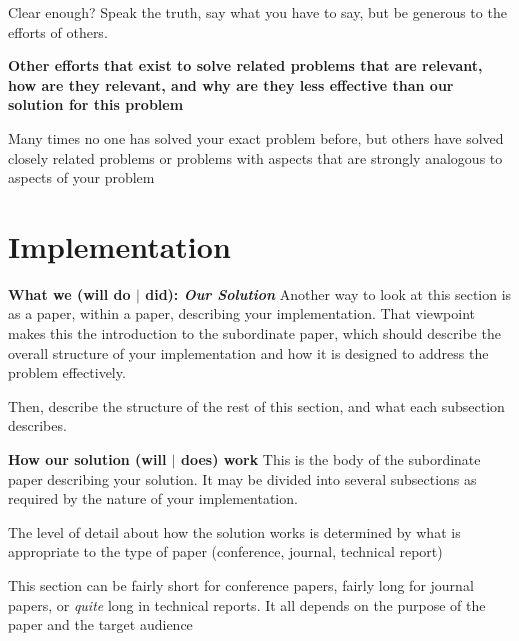 \documentclass[pdf,bookmarks,colorlinks=true]{IEEEtran}
\begin{document}
Clear enough? Speak the truth, say what you have to say, but be generous to the
efforts of others.



\textbf{Other efforts that exist to solve related problems that are
relevant, how are they relevant, and why are they less effective than our
solution for this problem}

Many times no one has solved your exact problem before, but others have solved
closely related problems or problems with aspects that are strongly analogous
to aspects of your problem


\section{Implementation}
\label{sec:Implementation}

\textbf{What we (will do $|$ did): {\em Our Solution}}
Another way to look at this section is as a paper, within a paper,
describing your implementation. That viewpoint makes this the introduction to
the subordinate paper, which should describe the overall structure of your
implementation and how it is designed to address the problem effectively.

Then, describe the structure of the rest of this section, and what each
subsection describes.


\textbf{How our solution (will $|$ does) work}
This is the body of the subordinate paper describing your solution. It
may be divided into several subsections as required by the nature of your
implementation.

The level of detail about how the solution works is determined by what
is appropriate to the type of paper (conference, journal, technical report)

This section can be fairly short for conference papers, fairly long for
journal papers, or {\em quite} long in technical reports. It all depends on the
purpose of the paper and the target audience
\end{document}
